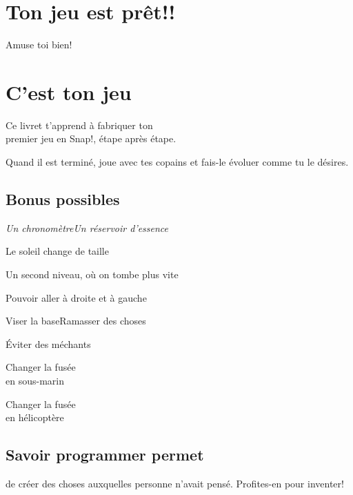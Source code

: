\documentclass[a7paper,pagesize,DIV=14,10pt]{scrbook}
\newcommand{\snap}{Snap!\xspace}
\begin{document}
\section*{Ton jeu est prêt!!}
\vspace{-.7\baselineskip}
Amuse toi bien!

\newpage 
\section*{C'est ton jeu}
\vspace{-.5\baselineskip}

Ce livret t'apprend à fabriquer ton \\
premier jeu en \snap, étape après étape.

\medskip
Quand il est terminé, joue avec tes copains et fais-le évoluer comme tu le
désires.

\vspace{-.3\baselineskip}
\subsection*{Bonus possibles}
\vspace{-.5\baselineskip}

{\it Un chronomètre\hfill Un réservoir d'essence

\smallskip
\centerline{Le soleil change de taille}

\smallskip
Un second niveau, où on tombe plus vite

\smallskip
\centerline{Pouvoir aller à droite et à gauche}

\smallskip
Viser la base\hfill Ramasser des choses

\smallskip
\centerline{Éviter des méchants}

\smallskip
\begin{minipage}{.5\linewidth}
  \center
  Changer la fusée\\
  en sous-marin
\end{minipage}%
\begin{minipage}{.5\linewidth}
  \center
  Changer la fusée\\
  en hélicoptère
\end{minipage}
}

\vspace{-.3\baselineskip}
\subsection*{Savoir programmer permet}
\vspace{-.7\baselineskip} %
de créer des choses auxquelles personne n'avait pensé. Profites-en pour
inventer!
\end{document}
